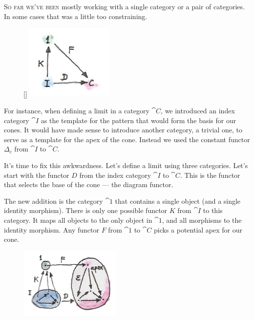 
\lettrine[lhang=0.17]{S}{o far we've been} mostly working with a single category or a pair of
categories. In some cases that was a little too constraining.

\begin{figure}
\raisebox{0pt}[\dimexpr{}\baselineskip\relax]{
\includegraphics[width=1.70833in]{images/kan2.jpg}}%
\end{figure}

For instance, when defining a limit in a category $\cat{C}$, we introduced an
index category $\cat{I}$ as the template for the pattern that would
form the basis for our cones. It would have made sense to introduce
another category, a trivial one, to serve as a template for the apex of
the cone. Instead we used the constant functor $\Delta_c$ from
$\cat{I}$ to $\cat{C}$.

It's time to fix this awkwardness. Let's define a limit using three
categories. Let's start with the functor $D$ from the index
category $\cat{I}$ to $\cat{C}$. This is the functor that selects the base
of the cone --- the diagram functor.

The new addition is the category $\cat{1}$ that contains a single
object (and a single identity morphism). There is only one possible
functor $K$ from $\cat{I}$ to this category. It maps all objects
to the only object in $\cat{1}$, and all morphisms to the identity
morphism. Any functor $F$ from $\cat{1}$ to $\cat{C}$ picks a
potential apex for our cone.

\begin{figure}[H]
\centering
\includegraphics[width=50mm]{images/kan15.jpg}
\end{figure}

